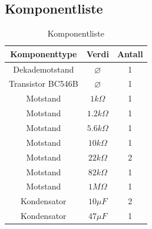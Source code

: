     \subsection{Komponentliste}
        \begin{table}[h]
            \centering
            \caption{Komponentliste}
            \label{tab:komponentliste}
            \begin{tabular}{|c|c|c|}
                \hline
                \rowcolor[gray]{0.9}
                \textbf{Komponenttype} & \textbf{Verdi} & \textbf{Antall} \\ \hline
                Dekademotstand             & $\varnothing$        & 1 \\ \hline
                Transistor BC546B             & $\varnothing$       & 1 \\ \hline
                Motstand                    & $1k\Omega$            & 1 \\ \hline
                Motstand                     & $1.2k\Omega$     & 1 \\ \hline
                Motstand                     & $5.6k\Omega$        & 1 \\ \hline
                Motstand                     & $10k\Omega$        & 1 \\ \hline
                Motstand                     & $22k\Omega$        & 2 \\ \hline
                Motstand                     & $82k\Omega$        & 1 \\ \hline
                Motstand                     & $1M\Omega$        & 1 \\ \hline
                Kondensator                  & $10\mu F$         & 2 \\ \hline
                Kondensator                  & $47\mu F$         & 1 \\ \hline

            \end{tabular}
        \end{table}
